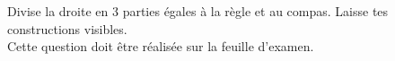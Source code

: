 %
%
    Divise la droite en 3 parties égales à la règle et au compas. Laisse tes constructions visibles.\\
    Cette question doit être réalisée sur la feuille d'examen.
    \begin{center}
        
    \end{center}
